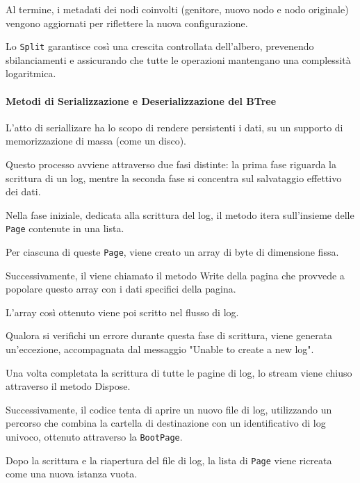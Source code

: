 \documentclass[12pt,a4paper,openright,twoside]{book}
\begin{document}
                    Al termine, i metadati dei nodi coinvolti (genitore, nuovo nodo e nodo originale) vengono aggiornati per riflettere la nuova configurazione.

                    Lo \texttt{Split} garantisce così una crescita controllata dell'albero, prevenendo sbilanciamenti e assicurando che tutte le operazioni mantengano una complessità logaritmica.

                \paragraph{Metodi di Serializzazione e Deserializzazione del BTree}

                  L'atto di seriallizare ha lo scopo di rendere persistenti i dati, su un supporto di memorizzazione di massa (come un disco).

                    Questo processo avviene attraverso due fasi distinte: la prima fase riguarda la scrittura di un log, mentre la seconda fase si concentra sul salvataggio effettivo dei dati.

                    Nella fase iniziale, dedicata alla scrittura del log, il metodo itera sull'insieme delle \texttt{Page} contenute in una lista.

                    Per ciascuna di queste \texttt{Page}, viene creato un array di byte di dimensione fissa.

                    Successivamente, il viene chiamato il metodo Write della pagina che provvede a popolare questo array con i dati specifici della pagina.

                    L'array così ottenuto viene poi scritto nel flusso di log.

                    Qualora si verifichi un errore durante questa fase di scrittura, viene generata un'eccezione, accompagnata dal messaggio "Unable to create a new log".

                    Una volta completata la scrittura di tutte le pagine di log, lo stream viene chiuso attraverso il metodo Dispose.

                    Successivamente, il codice tenta di aprire un nuovo file di log, utilizzando un percorso che combina la cartella di destinazione con un identificativo di log univoco, ottenuto attraverso la \texttt{BootPage}.

                    Dopo la scrittura e la riapertura del file di log, la lista di \texttt{Page} viene ricreata come una nuova istanza vuota.
\end{document}

